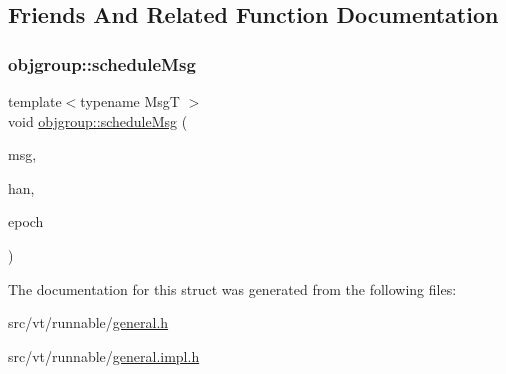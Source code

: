 \subsection{Friends And Related Function Documentation}
\mbox{\label{structvt_1_1runnable_1_1_runnable_a929210f79e51656f12e9b8458dc57887}} 
\subsubsection{\texorpdfstring{objgroup\+::schedule\+Msg}{objgroup::scheduleMsg}}
{\footnotesize\ttfamily template$<$typename MsgT $>$ \\
void \hyperlink{namespacevt_1_1objgroup_a7beec0700b3e4d81e0ea31027b445ecf}{objgroup\+::schedule\+Msg} (\begin{DoxyParamCaption}\item[{\hyperlink{namespacevt_a54674b9f819f4f3a652c6f78d9b62aaf}{Msg\+Virtual\+Ptr\+Any}}]{msg,  }\item[{\hyperlink{namespacevt_af64846b57dfcaf104da3ef6967917573}{Handler\+Type}}]{han,  }\item[{\hyperlink{namespacevt_a985a5adf291c34a3ca263b3378388236}{Epoch\+Type}}]{epoch }\end{DoxyParamCaption})\hspace{0.3cm}{\ttfamily [friend]}}



The documentation for this struct was generated from the following files\+:\begin{DoxyCompactItemize}
\item 
src/vt/runnable/\hyperlink{general_8h}{general.\+h}\item 
src/vt/runnable/\hyperlink{general_8impl_8h}{general.\+impl.\+h}\end{DoxyCompactItemize}
